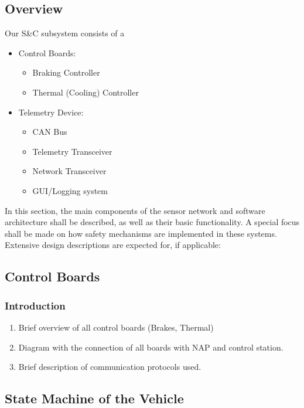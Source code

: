 \subsection{Overview}

Our S\&C subsystem consists of a 
\begin{itemize}
    \item Control Boards: \begin{itemize}
            \item Braking Controller
            \item Thermal (Cooling) Controller
    \end{itemize}

    \item Telemetry Device: \begin{itemize}
            \item CAN Bus
            \item Telemetry Transceiver
            \item Network Transceiver
            \item GUI/Logging system
    \end{itemize}
\end{itemize}
In this section, the main components of the sensor network and software architecture shall be described, as well as their basic functionality. A special focus shall be made on how safety mechanisms are implemented in these systems. Extensive design descriptions are expected for, if applicable:

\subsection{Control Boards}
\subsubsection{Introduction}
\begin{enumerate}
    \item Brief overview of all control boards (Brakes, Thermal)
    \item Diagram with the connection of all boards with NAP and control station.
    \item Brief description of communication protocols used.
\end{enumerate}



\subsection{State Machine of the Vehicle}

